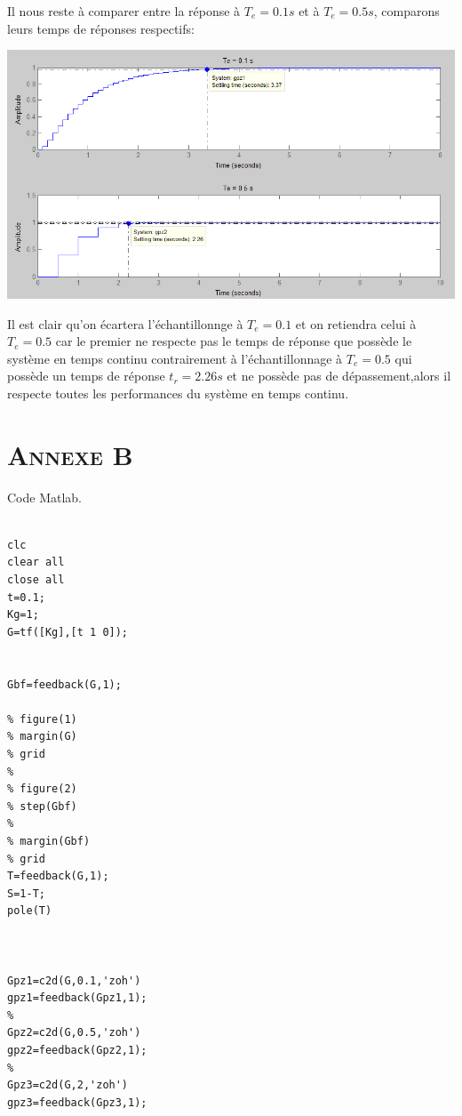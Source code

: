 \begin{appendices}
Il nous reste à comparer entre la réponse à $T_e=0.1s$ et à  $T_e=0.5s$, comparons leurs temps de réponses respectifs:\\
   
   	
	\begin{center}
	\includegraphics[scale=0.5]{mat1.png}
	\label{fig8} 
	\end{center}
	
\par Il est clair qu'on écartera l'échantillonnge à $T_e=0.1$ et on retiendra celui à $T_e=0.5$ car le premier ne respecte pas le temps de réponse que possède le système en temps continu contrairement à l'échantillonnage à $T_e=0.5 $ qui possède un temps de réponse $t_r = 2.26 s$ et ne possède pas de dépassement,alors il respecte toutes les performances du système en temps continu.\\ 	

\chapter*{\textsc{Annexe B}}
	\par Code Matlab.\\
	\begin{lstlisting}
	
clc
clear all
close all
t=0.1;
Kg=1;
G=tf([Kg],[t 1 0]);


Gbf=feedback(G,1);

% figure(1)
% margin(G)
% grid
% 
% figure(2)
% step(Gbf)
%   
% margin(Gbf)
% grid
T=feedback(G,1);
S=1-T;
pole(T)



Gpz1=c2d(G,0.1,'zoh')
gpz1=feedback(Gpz1,1);
% 
Gpz2=c2d(G,0.5,'zoh')
gpz2=feedback(Gpz2,1);
% 
Gpz3=c2d(G,2,'zoh')
gpz3=feedback(Gpz3,1);
 

\end{lstlisting}
\end{appendices}
